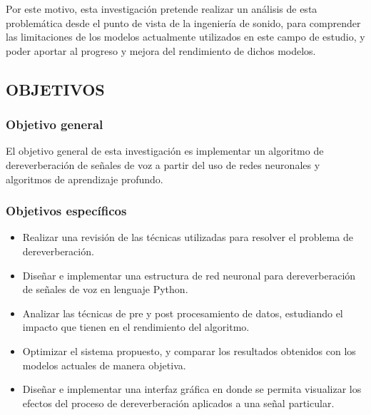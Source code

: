 Por este motivo, esta investigación pretende realizar un análisis de esta problemática desde el punto de vista de la ingeniería de sonido, para comprender las limitaciones de los modelos actualmente utilizados en este campo de estudio, y poder aportar al progreso y mejora del rendimiento de dichos modelos. 

\subsection[Objetivos]{OBJETIVOS}
\subsubsection{Objetivo general}

El objetivo general de esta investigación es implementar un algoritmo de dereverberación de señales de voz a partir del uso de redes neuronales y algoritmos de aprendizaje profundo. 

\subsubsection{Objetivos específicos}

\begin{itemize}
    \item Realizar una revisión de las técnicas utilizadas para resolver el problema de dereverberación.
    \item Diseñar e implementar una estructura de red neuronal para dereverberación de señales de voz en lenguaje Python.
    \item Analizar las técnicas de pre y post procesamiento de datos, estudiando el impacto que tienen en el rendimiento del algoritmo.
    \item Optimizar el sistema propuesto, y comparar los resultados obtenidos con los modelos actuales de manera objetiva.
    \item Diseñar e implementar una interfaz gráfica en donde se permita visualizar los efectos del proceso de dereverberación aplicados a una señal particular. 
\end{itemize}

